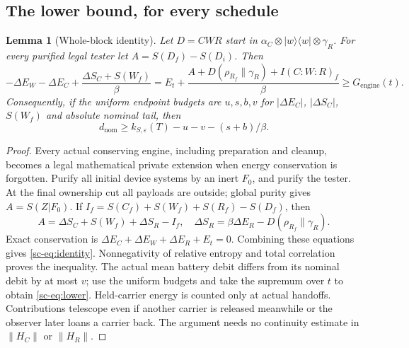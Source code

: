 \documentclass[11pt]{article}
\newtheorem{lemma}[theorem]{Lemma}
\theoremstyle{definition}
\theoremstyle{remark}
\providecommand{\eps}{\varepsilon}
\begin{document}
\subsection{The lower bound, for every schedule}
\begin{lemma}[Whole-block identity]\label{sc-lem:account}
Let $D=CWR$ start in $\alpha_C\otimes|w\rangle\langle w|\otimes\gamma_R$. For every purified legal tester let $A=S(D_f)-S(D_i)$. Then
\begin{equation}\label{sc-eq:identity}
-\Delta E_W-\Delta E_C+\frac{\Delta S_C+S(W_f)}{\beta}
=E_t+\frac{A+D(\rho_{R_f}\|\gamma_R)+I(C{:}W{:}R)_f}{\beta}
\ge G_{\mathrm{engine}}(t).
\end{equation}
Consequently, if the uniform endpoint budgets are $u,s,b,v$ for $|\Delta E_C|$, $|\Delta S_C|$, $S(W_f)$ and absolute nominal tail, then
\begin{equation}\label{sc-eq:lower}
d_{\mathrm{nom}}\ge k_{S,\eps}(T)-u-v-(s+b)/\beta.
\end{equation}
\end{lemma}
\begin{proof}
Every actual conserving engine, including preparation and cleanup, becomes a legal mathematical private extension when energy conservation is forgotten. Purify all initial device systems by an inert $F_0$, and purify the tester. At the final ownership cut all payloads are outside; global purity gives $A=S(Z|F_0)$. If $I_f=S(C_f)+S(W_f)+S(R_f)-S(D_f)$, then
\[
A=\Delta S_C+S(W_f)+\Delta S_R-I_f,
\quad
\Delta S_R=\beta\Delta E_R-D(\rho_{R_f}\|\gamma_R).
\]
Exact conservation is $\Delta E_C+\Delta E_W+\Delta E_R+E_t=0$. Combining these equations gives \eqref{sc-eq:identity}. Nonnegativity of relative entropy and total correlation proves the inequality. The actual mean battery debit differs from its nominal debit by at most $v$; use the uniform budgets and take the supremum over $t$ to obtain \eqref{sc-eq:lower}. Held-carrier energy is counted only at actual handoffs. Contributions telescope even if another carrier is released meanwhile or the observer later loans a carrier back. The argument needs no continuity estimate in $\|H_C\|$ or $\|H_R\|$.
\end{proof}
\end{document}
